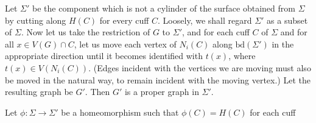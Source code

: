 Let $\Sigma'$ be the component which is not a cylinder of the surface obtained from $\Sigma$ by cutting along $H(C)$ for every cuff $C$. Loosely, we shall regard $\Sigma'$ as a subset of $\Sigma$. Now let us take the restriction of $G$ to $\Sigma'$, and for each cuff $C$ of $\Sigma$ and for all $x \in V(G) \cap C$, let us move each vertex of $N_i(C)$ along $\mathrm{bd}(\Sigma')$ in the appropriate direction until it becomes identified with $t(x)$, where $t(x) \in V(N_i(C))$. (Edges incident with the vertices we are moving must also be moved in the natural way, to remain incident with the moving vertex.) Let the resulting graph be $G'$. Then $G'$ is a proper graph in $\Sigma'$.

Let $\phi \colon \Sigma \to \Sigma'$ be a homeomorphism such that $\phi(C) = H(C)$ for each cuff
